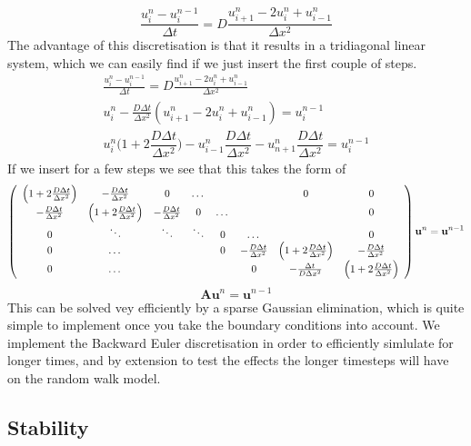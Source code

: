 \begin{equation}\label{BE_discretisation_isotropic}
 \frac{u^n_i - u^{n-1}_i}{\Delta t} = D\frac{u^n_{i+1}-2u^n_i +u^n_{i-1}}{\Delta x^2}
\end{equation}
The advantage of this discretisation is that it results in a tridiagonal linear system, which we can easily find if we just insert the first couple of steps.
\begin{align*}
 \frac{u^{n}_i-u^{n-1}_i}{\Delta t} = D\frac{u^n_{i+1}-2u^n_i + u^n_{i-1}}{\Delta x^2} \\
 u^n_i -\frac{D\Delta t}{\Delta x^2}\left(u^n_{i+1}-2u^n_i + u^n_{i-1}\right) = u^{n-1}_i \\
 u^n_i\Big(1+2\dfrac{D\Delta t}{\Delta x^2}\Big) -u^n_{i-1}\dfrac{D\Delta t}{\Delta x^2} - u^n_{n+1}\dfrac{D\Delta t}{\Delta x^2} 
 = u^{n-1}_i
\end{align*}
If we insert for a few steps we see that this takes the form of
\begin{align*}\label{BE}
 \left(\begin{array}{c c c c c c c c}
        \Big(1+2\frac{D\Delta t}{\Delta x^2}\Big) & -\frac{D\Delta t}{\Delta x^2} &0 &\dots & & &0 &0 \\
        -\frac{D\Delta t}{\Delta x^2} & \Big(1+2\frac{D\Delta t}{\Delta x^2}\Big) & -\frac{D\Delta t}{\Delta x^2} &0 &\dots & & &0 \\
        0& \ddots & \ddots & \ddots & 0 & \dots &  &0\\
        0& \dots & & &0&-\frac{D\Delta t}{\Delta x^2} & \Big(1+2\frac{D\Delta t}{\Delta x^2}\Big) & -\frac{D\Delta t}{\Delta x^2}\\
         0& \dots & && &0&-\frac{\Delta t}{D\Delta x^2} & \Big(1+2\frac{D\Delta t}{\Delta x^2}\Big) 
       \end{array}\right)\mathbf{u}^n = \mathbf{u}^{n-1} 
\end{align*}
\begin{equation*}
 \mathbf{A}\mathbf{u}^n = \mathbf{u}^{n-1}
\end{equation*}
This can be solved vey efficiently by a sparse Gaussian elimination, which is quite simple to implement once you take the boundary conditions into account. 
We implement the Backward Euler discretisation in order to efficiently simlulate for longer times, and by extension to test the effects the longer timesteps will have on the random walk model.

\subsection{Stability}\label{stability}

